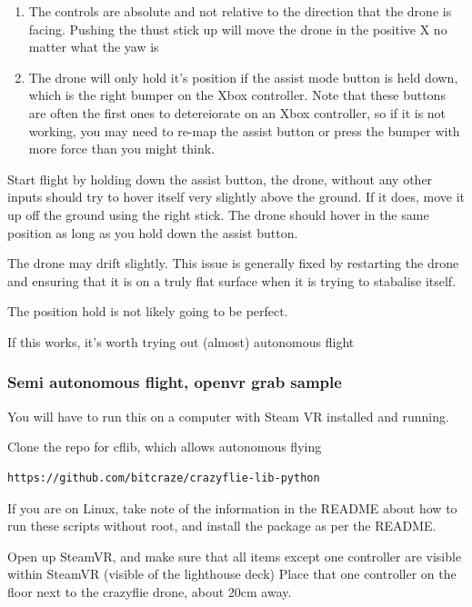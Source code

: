 \begin{enumerate}
\def\labelenumi{\arabic{enumi}.}
\tightlist
\item
  The controls are absolute and not relative to the direction that the
  drone is facing. Pushing the thust stick up will move the drone in the
  positive X no matter what the yaw is
\item
  The drone will only hold it's position if the assist mode button is
  held down, which is the right bumper on the Xbox controller. Note that
  these buttons are often the first ones to detereiorate on an Xbox
  controller, so if it is not working, you may need to re-map the assist
  button or press the bumper with more force than you might think.
\end{enumerate}

Start flight by holding down the assist button, the drone, without any
other inputs should try to hover itself very slightly above the ground.
If it does, move it up off the ground using the right stick. The drone
should hover in the same position as long as you hold down the assist
button.

The drone may drift slightly. This issue is generally fixed by
restarting the drone and ensuring that it is on a truly flat surface
when it is trying to stabalise itself.

The position hold is not likely going to be perfect.

If this works, it's worth trying out (almost) autonomous flight

\hypertarget{semi-autonomous-flight-openvr-grab-sample}{%
\subsubsection{Semi autonomous flight, openvr grab
sample}\label{semi-autonomous-flight-openvr-grab-sample}}

You will have to run this on a computer with Steam VR installed and
running.

Clone the repo for cflib, which allows autonomous flying

\begin{verbatim}
https://github.com/bitcraze/crazyflie-lib-python
\end{verbatim}

If you are on Linux, take note of the information in the README about
how to run these scripts without root, and install the package as per
the README.

Open up SteamVR, and make sure that all items except one controller are
visible within SteamVR (visible of the lighthouse deck) Place that one
controller on the floor next to the crazyflie drone, about 20cm away.


